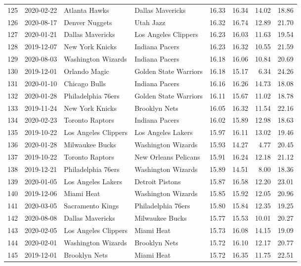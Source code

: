 \documentclass[
  11pt,
]{article}
\theoremstyle{nonumberplain}
\begin{document}
\begin{longtable}{rl|llr|rrr}
125 & 2020-02-22 & Atlanta Hawks & Dallas Mavericks & 16.33 & 16.34 & 14.02 & 18.86\\
126 & 2020-08-17 & Denver Nuggets & Utah Jazz & 16.32 & 16.74 & 12.89 & 21.70\\
127 & 2020-01-21 & Dallas Mavericks & Los Angeles Clippers & 16.23 & 16.03 & 11.63 & 19.54\\
128 & 2019-12-07 & New York Knicks & Indiana Pacers & 16.23 & 16.32 & 10.55 & 21.59\\
129 & 2020-08-03 & Washington Wizards & Indiana Pacers & 16.18 & 16.06 & 10.84 & 20.69\\
130 & 2019-12-01 & Orlando Magic & Golden State Warriors & 16.18 & 15.17 & 6.34 & 24.26\\
131 & 2020-01-10 & Chicago Bulls & Indiana Pacers & 16.16 & 16.26 & 14.73 & 18.08\\
132 & 2020-01-28 & Philadelphia 76ers & Golden State Warriors & 16.11 & 15.67 & 11.02 & 18.78\\
133 & 2019-11-24 & New York Knicks & Brooklyn Nets & 16.05 & 16.32 & 11.54 & 22.16\\
134 & 2020-02-23 & Toronto Raptors & Indiana Pacers & 16.02 & 15.89 & 12.98 & 18.63\\
135 & 2019-10-22 & Los Angeles Clippers & Los Angeles Lakers & 15.97 & 16.11 & 13.02 & 19.46\\
136 & 2020-01-28 & Milwaukee Bucks & Washington Wizards & 15.93 & 14.27 & 4.77 & 20.45\\
137 & 2019-10-22 & Toronto Raptors & New Orleans Pelicans & 15.91 & 16.24 & 12.18 & 21.12\\
138 & 2019-12-21 & Philadelphia 76ers & Washington Wizards & 15.89 & 14.51 & 8.00 & 18.36\\
139 & 2020-01-05 & Los Angeles Lakers & Detroit Pistons & 15.87 & 16.58 & 12.20 & 23.01\\
140 & 2019-12-06 & Miami Heat & Washington Wizards & 15.85 & 15.92 & 12.05 & 20.96\\
141 & 2020-03-05 & Sacramento Kings & Philadelphia 76ers & 15.80 & 15.84 & 12.35 & 19.25\\
142 & 2020-08-08 & Dallas Mavericks & Milwaukee Bucks & 15.77 & 15.53 & 10.01 & 20.27\\
143 & 2020-02-05 & Los Angeles Clippers & Miami Heat & 15.73 & 16.08 & 14.15 & 19.09\\
144 & 2020-02-01 & Washington Wizards & Brooklyn Nets & 15.72 & 16.10 & 12.17 & 20.77\\
145 & 2019-12-01 & Brooklyn Nets & Miami Heat & 15.72 & 16.35 & 11.75 & 22.51\\

\end{longtable}
\end{document}

